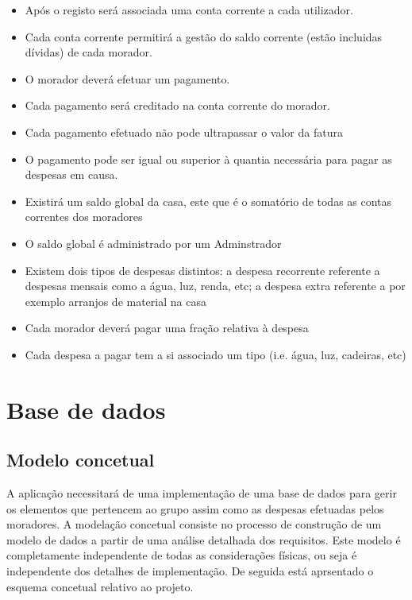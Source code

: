 \begin{itemize}
	
\item{Após o registo será associada uma conta corrente a cada utilizador.}

\item{Cada conta corrente permitirá a gestão do saldo corrente (estão incluidas dívidas) de cada morador.}

\item{O morador deverá efetuar um pagamento.}
 
\item{Cada pagamento será creditado na conta corrente do morador.}

\item{Cada pagamento efetuado não pode ultrapassar o valor da fatura}
 
 \item{O pagamento pode ser igual ou superior à quantia necessária para pagar as despesas em causa.}
 
 
\item{Existirá um saldo global da casa, este que é o somatório de todas as contas correntes dos moradores}
 
 \item{O saldo global é administrado por um Adminstrador}
 
\item{Existem dois tipos de despesas distintos: a despesa recorrente referente a despesas mensais como a água, luz, renda, etc; a despesa extra referente a por exemplo arranjos de material na casa}
 
\item{Cada morador deverá pagar uma fração relativa à despesa}
 
\item{Cada despesa a pagar tem a si associado um tipo (i.e. água, luz, cadeiras, etc)}

\end{itemize}


\section{Base de dados}
\subsection{Modelo concetual}
A aplicação necessitará de uma implementação de uma base de dados para gerir os elementos que pertencem ao grupo assim como as despesas efetuadas pelos moradores. A modelação concetual consiste no processo de construção de um modelo de dados a partir de uma análise detalhada dos requisitos.  Este modelo é completamente independente de todas as considerações físicas, ou seja é independente dos detalhes de implementação. De seguida está aprsentado o esquema concetual relativo ao projeto.  


